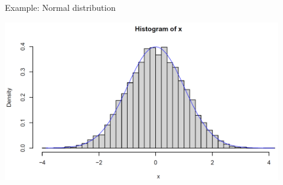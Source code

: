 \documentclass[11pt,compress,t,notes=noshow, xcolor=table]{beamer}
\begin{document}
\begin{vbframe}{Example: Normal distribution}
\begin{center}
\includegraphics[width =0.9\textwidth]{figure_man/histo.png}
\end{center}


\end{vbframe}


\end{document}
